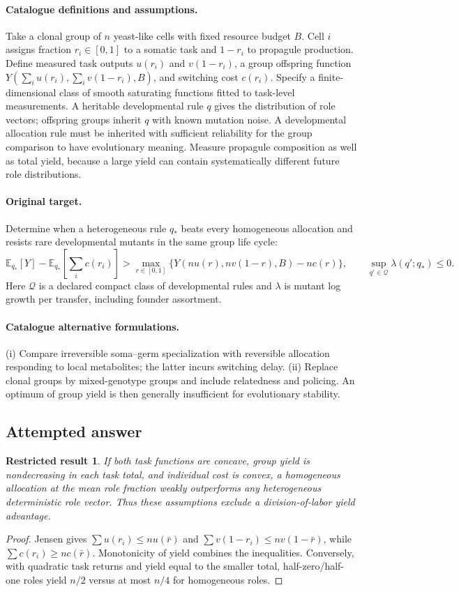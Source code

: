 \documentclass[11pt]{article}
\newcommand{\E}{\mathbb E}
\providecommand{\E}{\mathbb E}
\newtheorem{attemptresult}{Restricted result}[section]
\begin{document}
\paragraph{Catalogue definitions and assumptions.}
Take a clonal group of $n$ yeast-like cells with fixed resource budget $B$. Cell $i$ assigns fraction $r_i\in[0,1]$ to a somatic task and $1-r_i$ to propagule production. Define measured task outputs $u(r_i)$ and $v(1-r_i)$, a group offspring function $Y(\sum_i u(r_i),\sum_i v(1-r_i),B)$, and switching cost $c(r_i)$. Specify a finite-dimensional class of smooth saturating functions fitted to task-level measurements. A heritable developmental rule $q$ gives the distribution of role vectors; offspring groups inherit $q$ with known mutation noise. A developmental allocation rule must be inherited with sufficient reliability for the group comparison to have evolutionary meaning. Measure propagule composition as well as total yield, because a large yield can contain systematically different future role distributions.
\paragraph{Original target.}
Determine when a heterogeneous rule $q_*$ beats every homogeneous allocation and resists rare developmental mutants in the same group life cycle:
\[
 \E_{q_*}[Y]-\E_{q_*}\!\left[\sum_i c(r_i)\right]
 >\max_{r\in[0,1]}\{Y(nu(r),nv(1-r),B)-nc(r)\},
 \qquad \sup_{q'\in\mathcal Q}\lambda(q';q_*)\le0.
\]
Here $\mathcal Q$ is a declared compact class of developmental rules and $\lambda$ is mutant log growth per transfer, including founder assortment.
\paragraph{Catalogue alternative formulations.}
(i) Compare irreversible soma--germ specialization with reversible allocation responding to local metabolites; the latter incurs switching delay. (ii) Replace clonal groups by mixed-genotype groups and include relatedness and policing. An optimum of group yield is then generally insufficient for evolutionary stability.
\subsection{Attempted answer}
\begin{attemptresult}
If both task functions are concave, group yield is nondecreasing in each task total, and individual cost is convex, a homogeneous allocation at the mean role fraction weakly outperforms any heterogeneous deterministic role vector. Thus these assumptions exclude a division-of-labor yield advantage.
\end{attemptresult}
\begin{proof}
Jensen gives $\sum u(r_i)\leq nu(\bar r)$ and $\sum v(1-r_i)\leq nv(1-\bar r)$, while $\sum c(r_i)\geq nc(\bar r)$. Monotonicity of yield combines the inequalities. Conversely, with quadratic task returns and yield equal to the smaller total, half-zero/half-one roles yield $n/2$ versus at most $n/4$ for homogeneous roles.
\end{proof}
\end{document}
